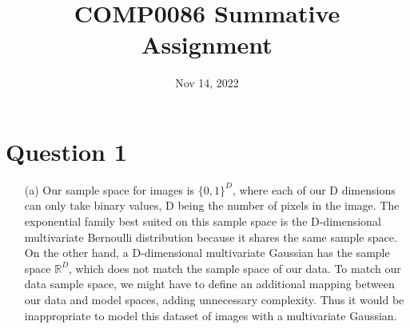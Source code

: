 \documentclass[12pt]{article}
\title{\textbf{COMP0086 Summative Assignment}}
\date{Nov 14, 2022}
\begin{document}
\maketitle
\section*{Question 1}


\begin{enumerate}

\item[(a)] Our sample space for images is $\{0, 1\}^D$, where each of our D dimensions can only take binary values, D being the number of pixels in the image.
The exponential family best suited on this sample space is the D-dimensional multivariate Bernoulli distribution because it shares the same sample space.
On the other hand, a D-dimensional multivariate Gaussian has the sample space $\mathbb{R}^D$, which does not match the sample space of our data.
To match our data sample space, we might have to define an additional mapping between our data and model spaces, adding unnecessary complexity.
Thus it would be inappropriate to model this dataset of images with a multivariate Gaussian.


\end{enumerate}
\end{document}

